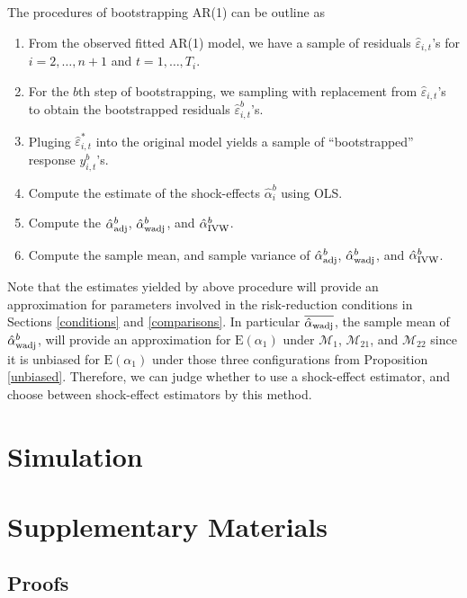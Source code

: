 \documentclass[11pt]{article}
\def\mc#1{\mathcal{#1}} %
\def\E#1{\mathrm{E}(#1)} %
\theoremstyle{definition}
\begin{document}
The procedures of bootstrapping AR(1) can be outline as
\begin{enumerate}
  \item From the observed fitted AR(1) model, we have a sample of residuals $\hat{\varepsilon}_{i, t}$'s for $i = 2, \ldots, n+1$ and $t=1, \ldots, T_i$. 
  \item For the $b$th step of bootstrapping, we sampling with replacement from $\hat{\varepsilon}_{i, t}$'s to obtain  the bootstrapped residuals $\hat{\varepsilon}_{i, t}^b$'s.
  \item Pluging $\hat{\varepsilon}_{i, t}^*$ into the original model yields a sample of ``bootstrapped'' response $y_{i, t}^b$'s.
  \item  Compute the estimate of the shock-effects $\hat{\alpha}_i^{b}$ using OLS.
  \item Compute the $\hat{\alpha}_{\rm adj}^{b}$, $\hat{\alpha}_{\rm wadj}^{b}$, and $\hat{\alpha}_{\rm IVW}^{b}$. 
  \item Compute the sample mean, and sample variance of $\hat{\alpha}_{\rm adj}^{b}$, $\hat{\alpha}_{\rm wadj}^{b}$, and $\hat{\alpha}_{\rm IVW}^{b}$.
\end{enumerate}
Note that the estimates yielded by above procedure will provide an approximation for parameters involved in the risk-reduction conditions in Sections \ref{conditions} and \ref{comparisons}. In particular $\overline{\hat{\alpha}_{\rm wadj}}$, the sample mean of $\hat{\alpha}_{\rm wadj}^{b}$, will provide an approximation for $\E{\alpha_1}$ under $\mc{M}_1$, $\mc{M}_{21}$, and $\mc{M}_{22}$ since it is unbiased for $\E{\alpha_1}$ under those three configurations from Proposition \ref{unbiased}. Therefore, we can judge whether to use a shock-effect estimator, and choose between  shock-effect estimators by this method.



\section{Simulation}

\label{simulation}


\section{Supplementary Materials}

\subsection{Proofs}
\end{document}
